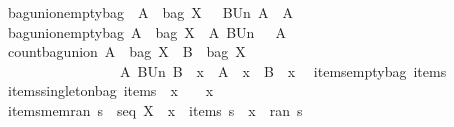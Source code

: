\begin{isabellebody}
\ \ bagunion{\isacharunderscore}emptybag{\isacharcolon}\ \ {\isachardoublequoteopen}{\isacharparenleft}A\ {\isacharcolon}\ {\isacharparenleft}bag\ X{\isacharparenright}{\isacharparenright}\ {\isacharminus}{\isacharminus}{\isachargreater}\ {\isacharparenleft}{\isacharparenleft}{\isacharpercent}{\isacharbrackleft}{\isacharpercent}{\isacharbrackright}\ BUn\ A{\isacharparenright}\ {\isacharequal}\ A{\isacharparenright}{\isachardoublequoteclose}\isanewline
\ \ bagunion{\isacharunderscore}emptybag{}{\isacharcolon}\ {\isachardoublequoteopen}{\isacharparenleft}A\ {\isacharcolon}\ {\isacharparenleft}bag\ X{\isacharparenright}{\isacharparenright}\ {\isacharminus}{\isacharminus}{\isachargreater}\ {\isacharparenleft}{\isacharparenleft}A\ BUn\ {\isacharpercent}{\isacharbrackleft}{\isacharpercent}{\isacharbrackright}{\isacharparenright}\ {\isacharequal}\ A{\isacharparenright}{\isachardoublequoteclose}\isanewline
\ \ count{\isacharunderscore}bagunion{\isacharcolon}\ {\isachardoublequoteopen}{\isacharparenleft}A\ {\isacharcolon}\ {\isacharparenleft}bag\ X{\isacharparenright}{\isacharparenright}\ {\isacharminus}{\isacharminus}{\isachargreater}\ {\isacharparenleft}B\ {\isacharcolon}\ {\isacharparenleft}bag\ X{\isacharparenright}{\isacharparenright}\ {\isacharminus}{\isacharminus}{\isachargreater}\ \isanewline
\ \ \ \ \ \ \ \ \ \ \ \ \ \ \ \ \ \ {\isacharparenleft}{\isacharparenleft}{\isacharparenleft}A\ BUn\ B{\isacharparenright}\ {\isacharbrackleft}{\isacharhash}{\isacharbrackright}\ x{\isacharparenright}\ {\isacharequal}\ {\isacharparenleft}A\ {\isacharbrackleft}{\isacharhash}{\isacharbrackright}\ x\ {\isacharplus}\ B\ {\isacharbrackleft}{\isacharhash}{\isacharbrackright}\ x{\isacharparenright}{\isacharparenright}{\isachardoublequoteclose}\isanewline
\ \ items{\isacharunderscore}emptybag{\isacharcolon}\ {\isachardoublequoteopen}items\ {\isacharpercent}{\isacharless}{\isacharpercent}{\isachargreater}\ {\isacharequal}\ {\isacharpercent}{\isacharbrackleft}{\isacharpercent}{\isacharbrackright}{\isachardoublequoteclose}\ \isanewline
\ \ items{\isacharunderscore}singletonbag{\isacharcolon}\ {\isachardoublequoteopen}items\ {\isacharpercent}{\isacharless}\ x\ {\isacharpercent}{\isachargreater}\ {\isacharequal}\ {\isacharpercent}{\isacharbrackleft}\ x\ {\isacharpercent}{\isacharbrackright}{\isachardoublequoteclose}\ \isanewline
\ \ items{\isacharunderscore}mem{\isacharunderscore}ran{\isacharcolon}\ {\isachardoublequoteopen}{\isacharparenleft}s\ {\isacharcolon}\ {\isacharparenleft}seq\ X{\isacharparenright}{\isacharparenright}\ {\isacharminus}{\isacharminus}{\isachargreater}\ {\isacharparenleft}{\isacharparenleft}x\ {\isacharbrackleft}{\isacharcolon}\ {\isacharparenleft}items\ s{\isacharparenright}{\isacharparenright}\ {\isacharequal}\ {\isacharparenleft}x\ {\isacharcolon}\ {\isacharparenleft}ran\ s{\isacharparenright}{\isacharparenright}{\isacharparenright}{\isachardoublequoteclose}\isanewline

\end{isabellebody}
